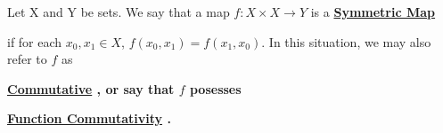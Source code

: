 \label{def:Symmetricmap}
\newcommand{\SymmetricMap}[0]{
    \bf \hyperref[def:Symmetricmap]{Symmetric Map} \rm
}
\newcommand{\CommutativeFunction}[0]{
    \bf \hyperref[def:Symmetricmap]{Commutative} \rm
}
\newcommand{\FunctionCommutativity}[0]{
    \bf \hyperref[def:Symmetricmap]{Function Commutativity} \rm
}
\begin{df}
    Let X and Y be sets. 
    We say that a map 
    $f:X \times X \to Y$ is a \SymmetricMap 
    if for each 
    $x_0,x_1 \in X$, 
    $f(x_0,x_1)=f(x_1,x_0)$.
    In this situation, 
    we may also refer to $f$ as
    \CommutativeFunction, 
    or say that $f$ posesses 
    \FunctionCommutativity.
\end{df} 
